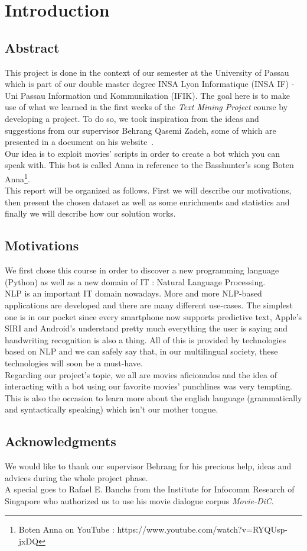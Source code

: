 \section{Introduction}
\subsection{Abstract}
This project is done in the context of our semester at the University of Passau which is part of our double master degree INSA Lyon Informatique (INSA IF) - Uni Passau Information und Kommunikation (IFIK).
The goal here is to make use of what we learned in the first weeks of the \textit{Text Mining Project} course by developing a project. To do so, we took inspiration from the ideas and suggestions from our supervisor Behrang Qasemi Zadeh, some of which are presented in a document on his website~\cite{idea}. \\
Our idea is to exploit movies' scripts in order to create a bot which you can speak with. This bot is called Anna in reference to the Basshunter's song Boten Anna\footnote{Boten Anna on YouTube : https://www.youtube.com/watch?v=RYQUsp-jxDQ}. \\
This report will be organized as follows. First we will describe our motivations, then present the chosen dataset as well as some enrichments and statistics and finally we will describe how our solution works.
%
\subsection{Motivations}
We first chose this course in order to discover a new programming language (Python) as well as a new domain of IT : Natural Language Processing.\\
NLP is an important IT domain nowadays. More and more NLP-based applications are developed and there are many different use-cases. The simplest one is in our pocket since every smartphone now supports predictive text, Apple's SIRI and Android's  understand pretty much everything the user is saying and handwriting recognition is also a thing. All of this is provided by technologies based on NLP and we can safely say that, in our multilingual society, these technologies will soon be a must-have.\\
Regarding our project's topic, we all are movies aficionados and the idea of interacting with a bot using our favorite movies' punchlines was very tempting. This is also the occasion to learn more about the english language (grammatically and syntactically speaking) which isn't our mother tongue.

\subsection{Acknowledgments}
We would like to thank our supervisor Behrang for his precious help, ideas and advices during the whole project phase.\\
A special  goes to Rafael E. Banchs from the Institute for Infocomm Research of Singapore who authorized us to use his movie dialogue corpus \textit{Movie-DiC}.

